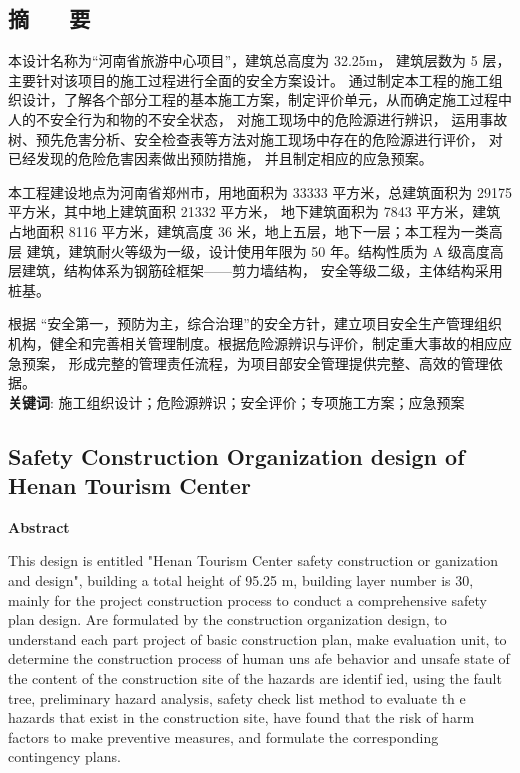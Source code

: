 \begin{center}
\section*{  \textbf{摘 ~~ 要}}
\end{center}

\vskip0.5cm
\setlength{\baselineskip}{20pt}

本设计名称为“河南省旅游中心项目”，建筑总高度为 32.25m， 建筑层数为 5  层，主要针对该项目的施工过程进行全面的安全方案设计。
通过制定本工程的施工组织设计，了解各个部分工程的基本施工方案，制定评价单元，从而确定施工过程中人的不安全行为和物的不安全状态，
对施工现场中的危险源进行辨识， 运用事故树、预先危害分析、安全检查表等方法对施工现场中存在的危险源进行评价， 对已经发现的危险危害因素做出预防措施，
并且制定相应的应急预案。

本工程建设地点为河南省郑州市，用地面积为 33333 平方米，总建筑面积为 29175 平方米，其中地上建筑面积 21332 平方米，
地下建筑面积为 7843 平方米，建筑占地面积 8116 平方米，建筑高度 36 米，地上五层，地下一层；本工程为一类高层
建筑，建筑耐火等级为一级，设计使用年限为 50 年。结构性质为 A 级高度高层建筑，结构体系为钢筋硂框架——剪力墙结构，
安全等级二级，主体结构采用桩基。

根据 “安全第一，预防为主，综合治理”的安全方针，建立项目安全生产管理组织机构，健全和完善相关管理制度。根据危险源辨识与评价，制定重大事故的相应应急预案，
形成完整的管理责任流程，为项目部安全管理提供完整、高效的管理依据。\\



{ \heiti \textbf{关键词}:  \zhongsong 施工组织设计；危险源辨识；安全评价；专项施工方案；应急预案}
\pagestyle{fancy}




\clearpage
\begin{center}
    \section*{  \textbf{Safety Construction Organization design of Henan Tourism Center}}
     \textbf{Abstract}
    \end{center}


   This design is entitled "Henan Tourism Center safety construction or ganization and design", building a total height of 95.25 m, building layer number is 30, 
   mainly for the project construction process to conduct a comprehensive safety plan design. Are formulated by the construction organization design, 
   to understand each part project of basic construction plan, make evaluation unit, to determine the construction process of human uns afe behavior 
   and unsafe state of the content of the construction site of the hazards are identif ied, using the fault tree, preliminary hazard analysis, safety 
   check list method to evaluate th e hazards that exist in the construction site, have found that the risk of harm factors to make preventive measures,
    and formulate the corresponding contingency plans.

